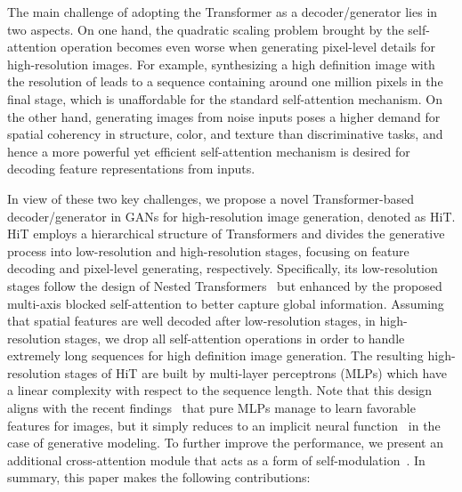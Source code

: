 \documentclass{article}
\begin{document}
The main challenge of adopting the Transformer as a decoder/generator lies in two aspects. On one hand, the quadratic scaling problem brought by the self-attention operation becomes even worse when generating pixel-level details for high-resolution images. For example, synthesizing a high definition image with the resolution of  leads to a sequence containing around one million pixels in the final stage, which is unaffordable for the standard self-attention mechanism. On the other hand, generating images from noise inputs poses a higher demand for spatial coherency in structure, color, and texture than discriminative tasks, and hence a more powerful yet efficient self-attention mechanism is desired for decoding feature representations from inputs.

In view of these two key challenges, we propose a novel Transformer-based decoder/generator in GANs for high-resolution image generation, denoted as HiT.
HiT employs a hierarchical structure of Transformers and divides the generative process into low-resolution and high-resolution stages, focusing on feature decoding and pixel-level generating, respectively. Specifically, its low-resolution stages follow the design of Nested Transformers~\cite{zhang2021aggregating} but enhanced by the proposed multi-axis blocked self-attention to better capture global information. Assuming that spatial features are well decoded after low-resolution stages, in high-resolution stages, we drop all self-attention operations in order to handle extremely long sequences for high definition image generation. The resulting high-resolution stages of HiT are built by multi-layer perceptrons (MLPs) which have a linear complexity with respect to the sequence length. Note that this design aligns with the recent findings~\cite{tolstikhin2021mlp,touvron2021resmlp} that pure MLPs manage to learn favorable features for images, but it 
simply reduces to an implicit neural function~\cite{mescheder2019occupancy,mildenhall2020nerf,park2019deepsdf} in the case of generative modeling. To further improve the performance, we present an additional cross-attention module that acts as a form of self-modulation~\cite{chen2019self}. In summary, this paper makes the following contributions:
\end{document}
